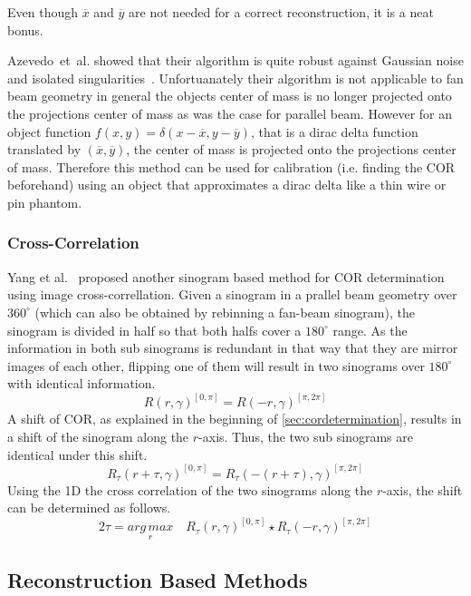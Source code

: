 \documentclass[10pt,journal,compsoc]{IEEEtran}
\begin{document}
%
Even though $\overline{x}$ and $\overline{y}$ are not needed for a correct reconstruction, it is a neat bonus.

Azevedo~et~al. showed that their algorithm is quite robust against Gaussian noise and isolated singularities~\cite{azevedo90}.
Unfortuanately their algorithm is not applicable to fan beam geometry in general the objects center of mass is no longer projected onto the projections center of mass as was the case for parallel beam.
However for an object function $f(x,y) = \delta(x-\overline{x}, y-\overline{y})$, that is a dirac delta function translated by $(\overline{x},\overline{y})$, the center of mass is projected onto the projections center of mass.
Therefore this method can be used for calibration (i.e. finding the COR beforehand) using an object that approximates a dirac delta like a thin wire or pin phantom. 

\subsubsection{Cross-Correlation}
Yang et al.~\cite{Yang2011} proposed another sinogram based method for COR determination using image cross-correllation.
Given a sinogram in a prallel beam geometry over $360^\circ$ (which can also be obtained by rebinning a fan-beam sinogram), the sinogram is divided in half so that both halfs cover a $180^\circ$ range.
As the information in both sub sinograms is redundant in that way that they are mirror images of each other,
flipping one of them will result in two sinograms over $180^\circ$ with identical information.
%
\begin{equation}
R(r,\gamma)^{[0,\pi]} = R(-r,\gamma)^{[\pi,2\pi]}
\end{equation}
%
A shift of COR, as explained in the beginning of \cref{sec:cordetermination}, results in a shift of the sinogram along the $r$-axis.
Thus, the two sub sinograms are identical under this shift.
%
\begin{equation}
R_\tau(r+\tau,\gamma)^{[0,\pi]} = R_\tau(-(r+\tau),\gamma)^{[\pi,2\pi]}
\end{equation}
%
Using the 1D the cross correlation of the two sinograms along the $r$-axis, the shift can be determined as follows.
%
\begin{equation}
2\tau = \underset{r}{arg\,max}\quad R_\tau(r,\gamma)^{[0,\pi]} \star R_\tau(-r,\gamma)^{[\pi,2\pi]}
\end{equation}
%  


\subsection{Reconstruction Based Methods}
\end{document}
